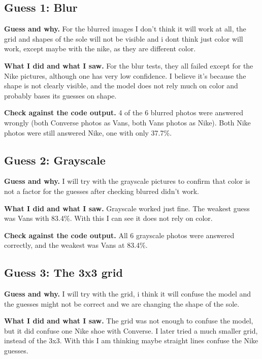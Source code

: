 \documentclass[11pt]{article}
\begin{document}
\subsection*{Guess 1: Blur}
\textbf{Guess and why.} For the blurred images I don't think it will work at all, the grid and shapes of the sole will not be visible and i dont think just color will work, except maybe with the nike, as they are different color.

\textbf{What I did and what I saw.} For the blur tests, they all failed except for the Nike pictures, although one has very low confidence. I believe it's because the shape is not clearly visible, and the model does not rely much on color and probably bases its guesses on shape.


\textbf{Check against the code output.} 4 of the 6 blurred photos were answered wrongly (both Converse photos as Vans, both Vans photos as Nike). Both Nike photos were still answered Nike, one with only 37.7\%.

\subsection*{Guess 2: Grayscale}
\textbf{Guess and why.} I will try with the grayscale pictures to confirm that color is not a factor for the guesses after checking blurred didn't work.

\textbf{What I did and what I saw.} Grayscale worked just fine. The weakest guess was Vans with 83.4\%. With this I can see it does not rely on color.


\textbf{Check against the code output.} All 6 grayscale photos were answered correctly, and the weakest was Vans at 83.4\%.

\subsection*{Guess 3: The 3x3 grid}
\textbf{Guess and why.} I will try with the grid, i think it will confuse the model and the guesses might not be correct and we are changing the shape of the sole.

\textbf{What I did and what I saw.} The grid was not enough to confuse the model, but it did confuse one Nike shoe with Converse. I later tried a much smaller grid, instead of the 3x3. With this I am thinking maybe straight lines confuse the Nike guesses.
\end{document}
